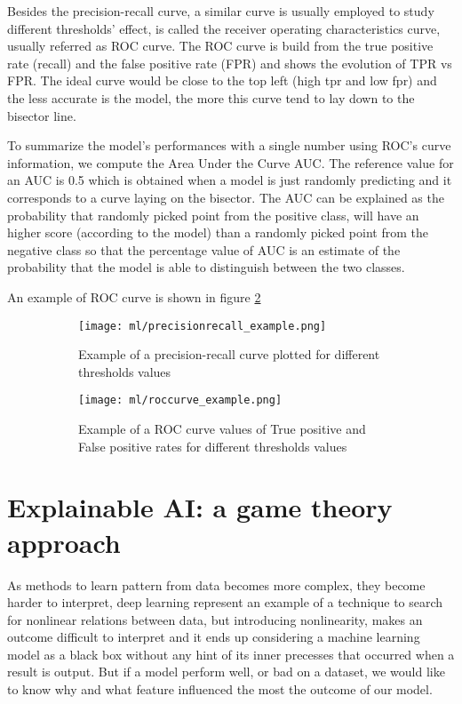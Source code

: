 \documentclass[10pt]{report}
\begin{document}
Besides the precision-recall curve, a similar curve is usually employed to study different thresholds' effect, is called the receiver operating characteristics curve, usually referred as ROC curve.
The ROC curve is build from the true positive rate (recall) and the false positive rate (FPR) and shows the evolution of TPR vs FPR.
The ideal curve would be close to the top left (high tpr and low fpr) and the less accurate is the model, the more this curve tend to lay down to the bisector line.

To summarize the model's performances with a single number using ROC's curve information, we compute the Area Under the Curve AUC.
The reference value for an AUC is 0.5 which is obtained when a model is just randomly predicting and it corresponds to a curve laying on the bisector.
The AUC can be explained as the probability that randomly picked point from the positive class, will have an higher score (according to the model) than a randomly picked point from the negative class so that the percentage value of AUC is an estimate of the probability that the model is able to distinguish between the two classes.

An example of ROC curve is shown in figure \ref{fig:roccurve}


\begin{figure}
\centering
\begin{subfigure}{0.4\textwidth}
\texttt{[image: ml/precisionrecall\_example.png]}
\caption{Example of a precision-recall curve plotted for different thresholds values}
\label{fig:precisionrecall}
\end{subfigure}
\begin{subfigure}{0.4\textwidth}
\texttt{[image: ml/roccurve\_example.png]}
\caption{Example of a ROC curve values of True positive and False positive rates for different thresholds values}
\label{fig:roccurve}
\end{subfigure}
\caption{}
\label{}
\end{figure}



\chapter{Explainable AI: a game theory approach}\label{chap:shapley_values}
As methods to learn pattern from data becomes more complex, they become harder to interpret, deep learning represent an example of a technique to search for nonlinear relations between data, but introducing nonlinearity, makes an outcome difficult to interpret and it ends up considering a machine learning model as a black box without any hint of its inner precesses that occurred when a result is output. But if a model perform well, or bad on a dataset, we would like to know why and what feature influenced the most the outcome of our model.
\end{document}
